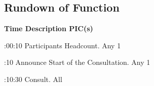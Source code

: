 \pagebreak
\subsection{Rundown of Function}

\setupTABLE[c][1][width=1.25in]
\setupTABLE[c][2][width=3.5in]
\setupTABLE[c][3][width=1.25in]
\bTABLE
\bTABLEhead

\bTR\bTH    \bf{Time}
\eTH\bTH    \bf{Description}
\eTH\bTH    \bf{PIC(s)}
\eTH\eTR

\eTABLEhead
\bTABLEbody

\bTR{}:00:10
\eTD\bTD Participants Headcount.
\eTD\bTD Any 1
\eTD\eTR

\bTR{}:10
\eTD\bTD Announce Start of the Consultation.
\eTD\bTD Any 1
\eTD\eTR

\bTR{}:10:30
\eTD\bTD Consult.
\eTD\bTD All
\eTD\eTR

\eTABLEbody
\eTABLE

\stopsection
\pagebreak
